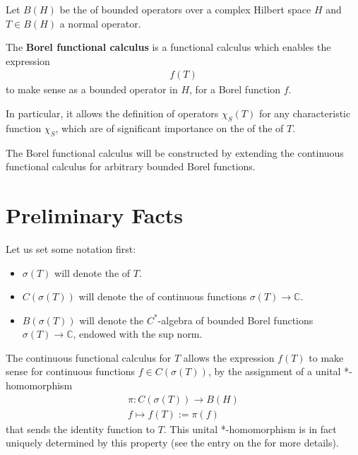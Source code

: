 \documentclass[12pt]{article}
\begin{document}

Let $B(H)$ be the  of bounded operators over a complex Hilbert space $H$ and $T \in B(H)$ a normal operator.

The {\bf Borel functional calculus} is a functional calculus which enables the expression
\begin{align*}
f(T)
\end{align*}
to make sense as a bounded operator in $H$, for a  Borel function $f$.

In particular, it allows the definition of operators $\chi_S (T)$ for any characteristic function $\chi_S$, which are of significant importance on the  of the  of $T$.

The Borel functional calculus will be constructed by extending the continuous functional calculus for arbitrary bounded Borel functions.

\section{Preliminary Facts}

Let us set some notation first:
\begin{itemize}
\item $\sigma(T)$ will denote the  of $T$.
\item $C(\sigma(T))$ will denote the  of continuous functions $\sigma(T) \to \mathbb{C}$.
\item $B(\sigma(T))$ will denote the $C^*$-algebra of bounded Borel functions $\sigma(T) \to \mathbb{C}$, endowed with the sup norm.
\end{itemize}

The continuous functional calculus for $T$ allows the expression $f(T)$ to make sense for continuous functions $f \in C(\sigma(T))$, by the assignment of a unital *-homomorphism
\begin{align*}
\pi: C(\sigma(T)) \longrightarrow B(H) \\
f \longmapsto f(T):= \pi(f)
\end{align*}
that sends the identity function to $T$. This unital *-homomorphism is in fact uniquely determined by this property (see the entry on the  for more details).
\end{document}
